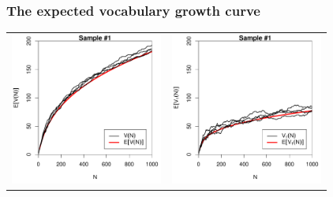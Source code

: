 \documentclass[handout,notes=show,t]{beamer} %
\begin{document}
\begin{frame}
  \frametitle{The expected vocabulary growth curve}

  \ungap[1]
  \begin{center}
    \begin{tabular}{c @{} c}
      \includegraphics[width=50mm]{img/05-samples-vgc-exp-vs-samples} &
      \includegraphics[width=50mm]{img/05-samples-vgc-V1-exp-vs-samples}
    \end{tabular}
  \end{center}
\end{frame}
\end{document}
